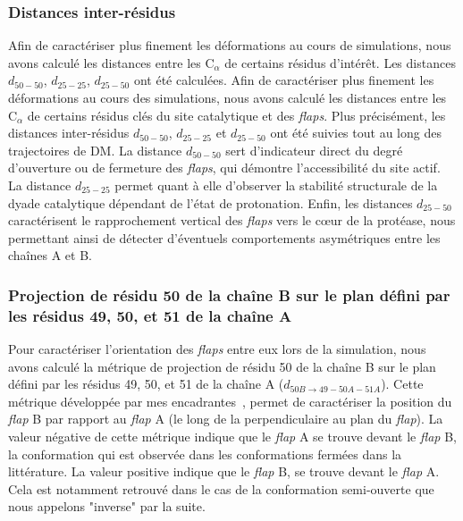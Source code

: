 \documentclass{isddmaster}
\begin{document}
	\subsubsection{Distances inter-résidus}
	Afin de caractériser plus finement les déformations au cours de simulations, nous avons calculé les distances entre les C$_\alpha$ de certains résidus d’intérêt.
    Les distances $d_{50-50}$, $d_{25-25}$, $d_{25-50}$ ont été calculées.
    Afin de caractériser plus finement les déformations au cours des simulations, nous avons calculé les distances entre les $\text{C}_\alpha$ de certains résidus clés du site catalytique et des \textit{flaps}.
    Plus précisément, les distances inter-résidus $d_{50-50}$, $d_{25-25}$ et $d_{25-50}$ ont été suivies tout au long des trajectoires de DM. La distance $d_{50-50}$ sert d'indicateur direct du degré d'ouverture ou de fermeture des \textit{flaps}, qui démontre l'accessibilité du site actif.
    La distance $d_{25-25}$ permet quant à elle d'observer la stabilité structurale de la dyade catalytique dépendant de l'état de protonation.
    Enfin, les distances $d_{25-50}$ caractérisent le rapprochement vertical des \textit{flaps} vers le cœur de la protéase, nous permettant ainsi de détecter d'éventuels comportements asymétriques entre les chaînes A et B. 
    
	\subsubsection{Projection de résidu 50 de la chaîne B sur le plan défini par les résidus 49, 50, et 51 de la chaîne A}
	Pour caractériser l'orientation des \textit{flaps} entre eux lors de la simulation, nous avons calculé la métrique de projection de résidu 50 de la chaîne B sur le plan défini par les résidus 49, 50, et 51 de la chaîne A ($d_{50B\xrightarrow{}49-50A-51A}$).
    Cette métrique développée par mes encadrantes~\cite{baillif_2026_18495249}, permet de caractériser la position du \textit{flap} B par rapport au \textit{flap} A (le long de la perpendiculaire au plan du \textit{flap}).
    La valeur négative de cette métrique indique que le \textit{flap} A se trouve devant le \textit{flap} B, la conformation qui est observée dans les conformations fermées dans la littérature. La valeur positive indique que le \textit{flap} B, se trouve devant le \textit{flap} A. Cela est notamment retrouvé dans le cas de la conformation semi-ouverte que nous appelons "inverse" par la suite.
\end{document}
